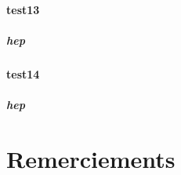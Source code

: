 \documentclass[a4paper,twoside,final]{book} %
\theoremstyle{definition}
\newcommand{\specialchap}[1]{%
\chapter{#1}%
\pagestyle{prefacestyle}%
\renewcommand\chaptername{#1}%
}
\begin{document}
\subsubsection{test13}\paragraph{hep}
\subsubsection{test14}\paragraph{hep}

\specialchap{Remerciements}
\lipsum




%
%
\end{document}
